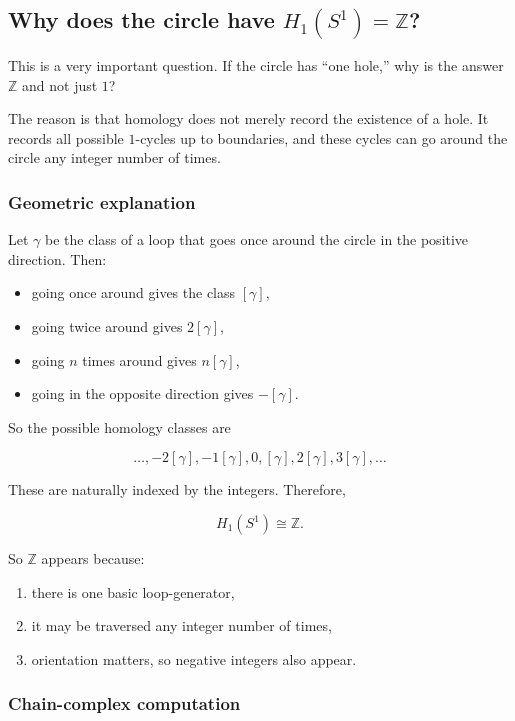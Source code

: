 \documentclass[12pt,a4paper]{article}
\theoremstyle{notespace}
\begin{document}
\subsection{Why does the circle have \(H_1(S^1)=\mathbb Z\)?}

This is a very important question. If the circle has ``one hole,'' why is the answer \(\mathbb Z\) and not just \(1\)?

The reason is that homology does not merely record the existence of a hole. It records all possible \(1\)-cycles up to boundaries, and these cycles can go around the circle any integer number of times.

\subsubsection{Geometric explanation}

Let \(\gamma\) be the class of a loop that goes once around the circle in the positive direction. Then:

\begin{itemize}
	\item going once around gives the class \([\gamma]\),
	\item going twice around gives \(2[\gamma]\),
	\item going \(n\) times around gives \(n[\gamma]\),
	\item going in the opposite direction gives \(-[\gamma]\).
\end{itemize}

So the possible homology classes are

\[
\ldots,-2[\gamma],-1[\gamma],0,[\gamma],2[\gamma],3[\gamma],\ldots
\]

These are naturally indexed by the integers. Therefore,

\[
H_1(S^1)\cong \mathbb Z.
\]

So \(\mathbb Z\) appears because:
\begin{enumerate}
	\item there is one basic loop-generator,
	\item it may be traversed any integer number of times,
	\item orientation matters, so negative integers also appear.
\end{enumerate}

\subsubsection{Chain-complex computation}
\end{document}
